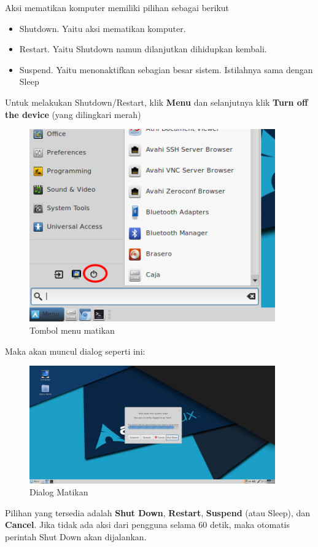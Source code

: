 \documentclass[12pt,]{article}
\begin{document}
	Aksi mematikan komputer memiliki pilihan sebagai berikut
	\begin{itemize}
		\item Shutdown. Yaitu aksi mematikan komputer.
		\item Restart. Yaitu Shutdown namun dilanjutkan dihidupkan kembali.
		\item Suspend. Yaitu menonaktifkan sebagian besar sistem. Istilahnya sama dengan Sleep
	\end{itemize}
	
	Untuk melakukan Shutdown/Restart, klik \textbf{Menu} dan selanjutnya klik \textbf{Turn off the device} (yang dilingkari merah)

	\begin{figure}[h]
		\centering
		\includegraphics[width=300pt]{png/turnoff}
		\caption{Tombol menu matikan}
	\end{figure}

	Maka akan muncul dialog seperti ini:

	\begin{figure}[h]
		\centering
		\includegraphics[width=300pt]{png/turnoffdlg}
		\caption{Dialog Matikan}
	\end{figure}

	Pilihan yang tersedia adalah \textbf{Shut Down}, \textbf{Restart}, \textbf{Suspend} (atau Sleep), dan \textbf{Cancel}.
	Jika tidak ada aksi dari pengguna selama 60 detik, maka otomatis perintah Shut Down akan dijalankan.
\end{document}

